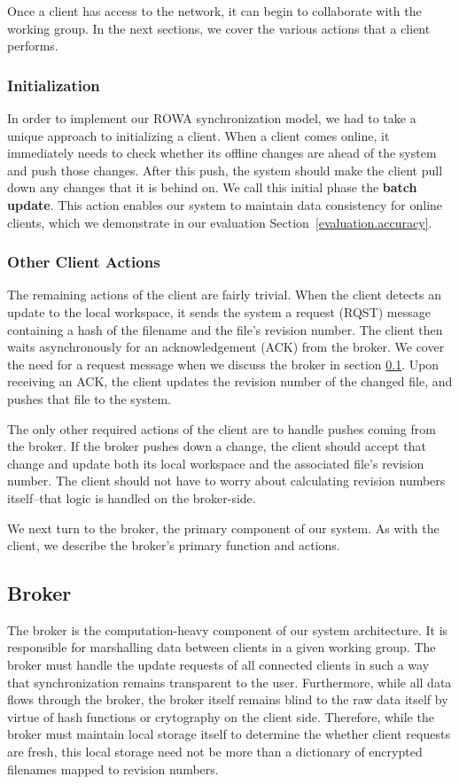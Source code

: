 Once a client has access to the network,
it can begin to collaborate with the working group.
In the next sections, we cover the various actions
that a client performs.

\subsubsection{Initialization}
In order to implement our ROWA synchronization model,
we had to take a unique approach to initializing a client.
When a client comes online,
it immediately needs to check whether its offline changes
are ahead of the system and push those changes.
After this push, the system should make the client
pull down any changes that it is behind on.
We call this initial phase the \textbf{batch update}.
This action enables our system to maintain data consistency
for online clients, which we demonstrate in our evaluation
Section~\ref{evaluation.accuracy}.

\subsubsection{Other Client Actions}
The remaining actions of the client are fairly trivial.
When the client detects an update to the local workspace,
it sends the system a request (RQST) message containing a hash
of the filename and the file's revision number.
The client then waits asynchronously for an acknowledgement
(ACK) from the broker.
We cover the need for a request message when we discuss the broker
in section \ref{broker}.
Upon receiving an ACK, the client updates the revision
number of the changed file,
and pushes that file to the system.

The only other required actions of the client are to handle
pushes coming from the broker.
If the broker pushes down a change,
the client should accept that change and update both its
local workspace and the associated file's revision number.
The client should not have to worry about calculating
revision numbers itself--that logic is handled on the broker-side.

We next turn to the broker,
the primary component of our system.
As with the client, we describe the broker's primary
function and actions.

\subsection{Broker}
\label{broker}
The broker is the computation-heavy component of our system architecture.
It is responsible for marshalling data between clients in a given
working group. The broker must handle the update requests
of all connected clients in such a way that
synchronization remains transparent to the user.
Furthermore, while all data flows through the broker,
the broker itself remains blind to the raw data itself by virtue
of hash functions or crytography on the client side.
Therefore, while the broker must maintain local storage
itself to determine the whether client requests are fresh,
this local storage need not be more than a dictionary of 
encrypted filenames mapped to revision numbers.

